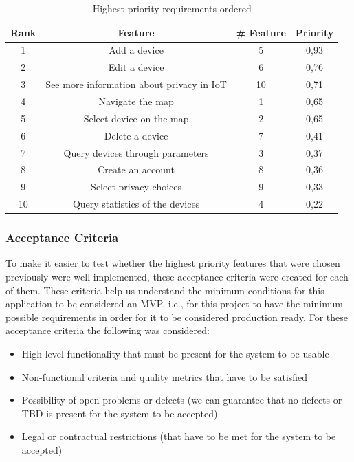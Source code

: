 \begin{table}[H]
    \centering
    \begin{tabular}{|c|c|c|c|}
        \hline
        \rowcolor{gray!50}
        \textbf{Rank} & \textbf{Feature} & \textbf{\# Feature} & \textbf{Priority} \\
        \hline
        1 & Add a device & 5 & 0,93 \\
        \hline
        2 & Edit a device & 6 & 0,76 \\
        \hline
        3 & See more information about privacy in IoT & 10 & 0,71 \\
        \hline
        4 & Navigate the map & 1 & 0,65 \\
        \hline
        5 & Select device on the map & 2 & 0,65 \\
        \hline
        6 & Delete a device & 7 & 0,41 \\
        \hline
        7 & Query devices through parameters & 3 & 0,37 \\
        \hline
        8 & Create an account & 8 & 0,36 \\
        \hline
        9 & Select privacy choices & 9 & 0,33 \\
        \hline
        10 & Query statistics of the devices & 4 & 0,22 \\
        \hline
    \end{tabular}
    \caption{Highest priority requirements ordered}
    \label{table:sorted requirements}
\end{table}

\subsubsection*{Acceptance Criteria}

To make it easier to test whether the highest priority features that were chosen
previously were well implemented, these acceptance criteria were created for each
of them. These criteria help us understand the minimum conditions for this
application to be considered an MVP, i.e., for this project to have the minimum
possible requirements in order for it to be considered production ready.
\newline
For these acceptance criteria the following was considered:

\begin{itemize}
    \item High-level functionality that must be present for the system to be usable
    \item Non-functional criteria and quality metrics that have to be satisfied
    \item Possibility of open problems or defects (we can guarantee that no defects or TBD is present for the system to be accepted)
    \item Legal or contractual restrictions (that have to be met for the system to be accepted)
\end{itemize}


